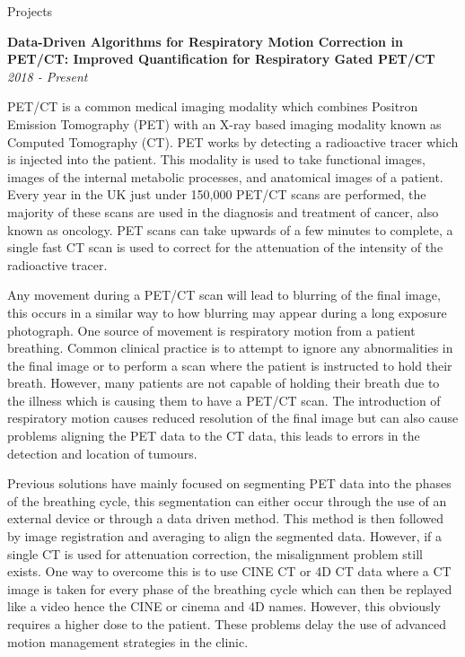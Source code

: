 \documentclass{cv}
\begin{document}
\begin{rSection}{Projects}

{\bf Data-Driven Algorithms for Respiratory Motion Correction in PET/CT: Improved Quantification for Respiratory Gated PET/CT} \hfill {\em 2018 - Present} 

\item PET/CT is a common medical imaging modality which combines Positron Emission Tomography (PET) with an X-ray based imaging modality known as Computed Tomography (CT). PET works by detecting a radioactive tracer which is injected into the patient. This modality is used to take functional images, images of the internal metabolic processes, and anatomical images of a patient. Every year in the UK just under 150,000 PET/CT scans are performed, the majority of these scans are used in the diagnosis and treatment of cancer, also known as oncology. PET scans can take upwards of a few minutes to complete, a single fast CT scan is used to correct for the attenuation of the intensity of the radioactive tracer.

\item Any movement during a PET/CT scan will lead to blurring of the final image, this occurs in a similar way to how blurring may appear during a long exposure photograph. One source of movement is respiratory motion from a patient breathing. Common clinical practice is to attempt to ignore any abnormalities in the final image or to perform a scan where the patient is instructed to hold their breath. However, many patients are not capable of holding their breath due to the illness which is causing them to have a PET/CT scan. The introduction of respiratory motion causes reduced resolution of the final image but can also cause problems aligning the PET data to the CT data, this leads to errors in the detection and location of tumours.

\item Previous solutions have mainly focused on segmenting PET data into the phases of the breathing cycle, this segmentation can either occur through the use of an external device or through a data driven method. This method is then followed by image registration and averaging to align the segmented data. However, if a single CT is used for attenuation correction, the misalignment problem still exists. One way to overcome this is to use CINE CT or 4D CT data where a CT image is taken for every phase of the breathing cycle which can then be replayed like a video hence the CINE or cinema and 4D names. However, this obviously requires a higher dose to the patient. These problems delay the use of advanced motion management strategies in the clinic.


\end{rSection}
\end{document}

